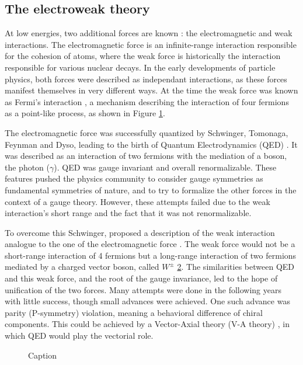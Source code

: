 \subsection{The electroweak theory}

At low energies, two additional forces are known : the electromagnetic and weak interactions. The electromagnetic force is an infinite-range interaction responsible for the cohesion of atoms, where the weak force is historically the interaction responsible for various nuclear decays. In the early developments of particle physics, both forces were described as independant interactions, as these forces manifest themselves in very different ways. At the time the weak force was known as Fermi's interaction \cite{Fermi2008}, a mechanism describing the interaction of four fermions as a point-like process, as shown in Figure \ref{fig:fermi_int}.

The electromagnetic force was successfully quantized by Schwinger, Tomonaga, Feynman and Dyso, leading to the birth of Quantum Electrodynamics (QED) \cite{PhysRev.80.440,PhysRev.76.749,PhysRev.76.769,PhysRev.74.1439,PhysRev.73.416,10.1143/PTP.1.27} . It was described as an interaction of two fermions with the mediation of a boson, the photon ($\gamma$). QED was gauge invariant and overall renormalizable. These features pushed the physics community to consider gauge symmetries as fundamental symmetries of nature, and to try to formalize the other forces in the context of a gauge theory. However, these attempts failed due to the weak interaction's short range and the fact that it was not renormalizable.

To overcome this Schwinger, proposed a description of the weak interaction analogue to the one of the electromagnetic force \cite{SCHWINGER1957407}. The weak force would not be a short-range interaction of 4 fermions but a long-range interaction of two fermions mediated by a charged vector boson, called $W^{\pm}$ \ref{fig:melectroweak}. The similarities between QED and this weak force, and the root of the gauge invariance, led to the hope of unification of the two forces. Many attempts were done in the following years with little success, though small advances were achieved. One such advance was parity (P-symmetry) violation, meaning a behavioral difference of chiral components. This could be achieved by a Vector-Axial theory (V-A theory) \cite{PhysRev.109.193,PhysRev.109.1860.2}, in which QED would play the vectorial role.

\begin{figure}
    \centering
    \begin{subfigure}{.5\textwidth}
    \label{fig:fermi_int}
    \centering
    
    \end{subfigure}
    \begin{subfigure}{.5\textwidth}
    \label{fig:melectroweak}
    \centering
    
    \end{subfigure}
    \caption{Caption}
    \label{fig:etomununu}
\end{figure}

